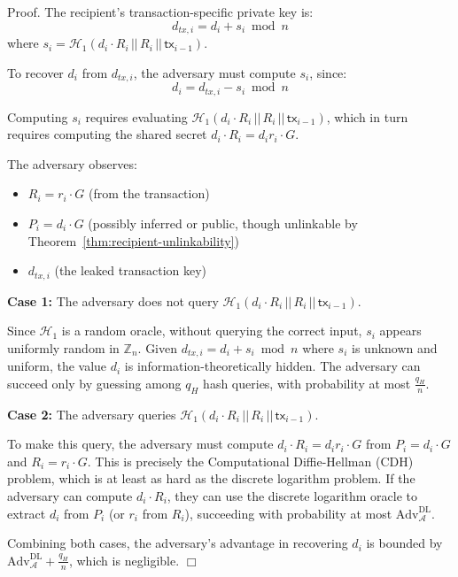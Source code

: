 \documentclass{article}
\newenvironment{proof}{\textsf{Proof}.}{\hfill$\Box$}
\begin{document}
\begin{proof}
The recipient's transaction-specific private key is:
$$d_{tx,i} = d_i + s_i \bmod n$$
where $s_i = \mathcal{H}_1(d_i \cdot R_i \,||\, R_i \,||\, \mathsf{tx}_{i-1})$.

To recover $d_i$ from $d_{tx,i}$, the adversary must compute $s_i$, since:
$$d_i = d_{tx,i} - s_i \bmod n$$

Computing $s_i$ requires evaluating $\mathcal{H}_1(d_i \cdot R_i \,||\, R_i \,||\, \mathsf{tx}_{i-1})$, which in turn requires computing the shared secret $d_i \cdot R_i = d_i r_i \cdot G$.

The adversary observes:
\begin{itemize}
\item $R_i = r_i \cdot G$ (from the transaction)
\item $P_i = d_i \cdot G$ (possibly inferred or public, though unlinkable by Theorem~\ref{thm:recipient-unlinkability})
\item $d_{tx,i}$ (the leaked transaction key)
\end{itemize}

\textbf{Case 1:} The adversary does not query $\mathcal{H}_1(d_i \cdot R_i \,||\, R_i \,||\, \mathsf{tx}_{i-1})$.

Since $\mathcal{H}_1$ is a random oracle, without querying the correct input, $s_i$ appears uniformly random in $\mathbb{Z}_n$. Given $d_{tx,i} = d_i + s_i \bmod n$ where $s_i$ is unknown and uniform, the value $d_i$ is information-theoretically hidden. The adversary can succeed only by guessing among $q_H$ hash queries, with probability at most $\frac{q_H}{n}$.

\textbf{Case 2:} The adversary queries $\mathcal{H}_1(d_i \cdot R_i \,||\, R_i \,||\, \mathsf{tx}_{i-1})$.

To make this query, the adversary must compute $d_i \cdot R_i = d_i r_i \cdot G$ from $P_i = d_i \cdot G$ and $R_i = r_i \cdot G$. This is precisely the Computational Diffie-Hellman (CDH) problem, which is at least as hard as the discrete logarithm problem. If the adversary can compute $d_i \cdot R_i$, they can use the discrete logarithm oracle to extract $d_i$ from $P_i$ (or $r_i$ from $R_i$), succeeding with probability at most $\text{Adv}^{\text{DL}}_{\mathcal{A}}$.

Combining both cases, the adversary's advantage in recovering $d_i$ is bounded by $\text{Adv}^{\text{DL}}_{\mathcal{A}} + \frac{q_H}{n}$, which is negligible.
\end{proof}
\end{document}
